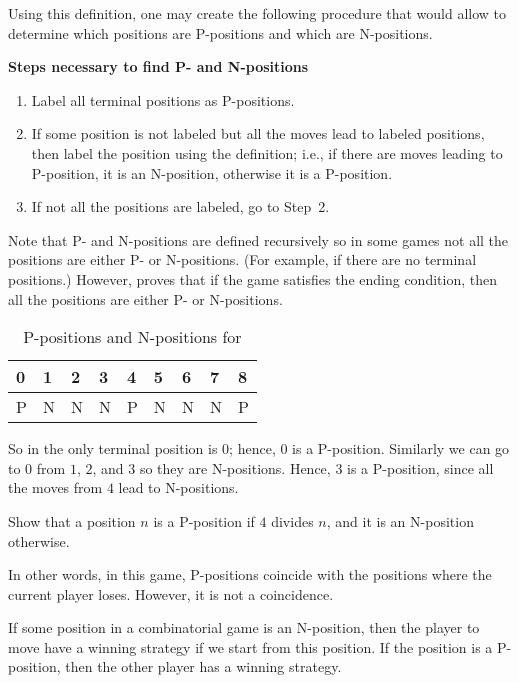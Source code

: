 Using this definition, one may create the following procedure that would allow
to determine which positions are P-positions and which are N-positions.
\begin{template}
  \textbf{Steps necessary to find P- and N-positions} \\

  \begin{enumerate}
    \item Label all terminal positions as P-positions.
    \item If some position is not labeled but all the moves lead to labeled
      positions, then label the position using the definition; i.e., if there
      are moves leading to P-position, it is an N-position, otherwise it is a
      P-position.
    \item If not all the positions are labeled, go to Step~2.
  \end{enumerate}
\end{template}


Note that P- and N-positions are defined recursively so in some games not all
the positions are either P- or N-positions. (For example, if there are no
terminal positions.) However, 
proves that if the game satisfies the ending condition, then all the positions
are either P- or N-positions.


\begin{table}[h!]
  \centering
  \begin{tabular}{l l l l l l l l l}
      \toprule
      0 & 1 & 2 & 3 & 4 & 5 & 6 & 7 & 8 \\
      \midrule
      P & N & N & N & P & N & N & N & P \\
      \bottomrule
  \end{tabular}
  \caption{P-positions and N-positions for }
  \label{table:take-away-21-3-2-1}
\end{table}


So in  the only terminal position is $0$;
hence, $0$ is a P-position. Similarly we can go to $0$ from $1$, $2$, and
$3$ so they are N-positions. Hence, $3$ is a P-position,
since all the moves from $4$ lead to N-positions.
\begin{exercise}
  Show that a position $n$ is a P-position if $4$ divides $n$, and
  it is an N-position otherwise.
\end{exercise}

In other words, in this game, P-positions coincide with the positions where the
current player loses. However, it is not a coincidence.
\begin{theorem}
  If some position in a combinatorial game is an N-position, then the player to
  move have a winning strategy if we start from this position. If the position
  is a P-position, then the other player has a winning strategy.
\end{theorem}

